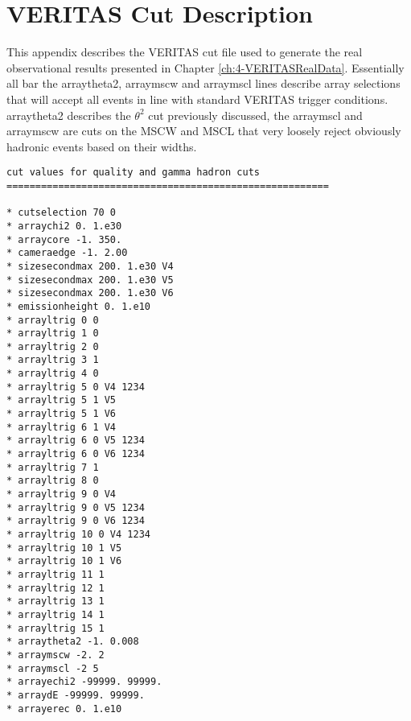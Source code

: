 \chapter{\label{app:1-VERITASCut}VERITAS Cut Description}
This appendix describes the VERITAS cut file used to generate the real observational results presented in Chapter \ref{ch:4-VERITASRealData}. Essentially all bar the arraytheta2, arraymscw and arraymscl lines describe array selections that will accept all events in line with standard VERITAS trigger conditions. arraytheta2 describes the $\theta^2$ cut previously discussed, the arraymscl and arraymscw are cuts on the MSCW and MSCL that very loosely reject obviously hadronic events based on their widths.

\begin{lstlisting}[label=verb1,caption=Cut Description Used for the real observations Analysis in Eventdisplay format,float,frame=tb]
cut values for quality and gamma hadron cuts
========================================================

* cutselection 70 0
* arraychi2 0. 1.e30
* arraycore -1. 350.
* cameraedge -1. 2.00
* sizesecondmax 200. 1.e30 V4
* sizesecondmax 200. 1.e30 V5
* sizesecondmax 200. 1.e30 V6
* emissionheight 0. 1.e10
* arrayltrig 0 0
* arrayltrig 1 0
* arrayltrig 2 0
* arrayltrig 3 1
* arrayltrig 4 0
* arrayltrig 5 0 V4 1234
* arrayltrig 5 1 V5
* arrayltrig 5 1 V6
* arrayltrig 6 1 V4
* arrayltrig 6 0 V5 1234
* arrayltrig 6 0 V6 1234
* arrayltrig 7 1
* arrayltrig 8 0
* arrayltrig 9 0 V4
* arrayltrig 9 0 V5 1234
* arrayltrig 9 0 V6 1234
* arrayltrig 10 0 V4 1234
* arrayltrig 10 1 V5
* arrayltrig 10 1 V6
* arrayltrig 11 1
* arrayltrig 12 1
* arrayltrig 13 1
* arrayltrig 14 1
* arrayltrig 15 1
* arraytheta2 -1. 0.008
* arraymscw -2. 2
* arraymscl -2 5
* arrayechi2 -99999. 99999.
* arraydE -99999. 99999.
* arrayerec 0. 1.e10
\end{lstlisting}
